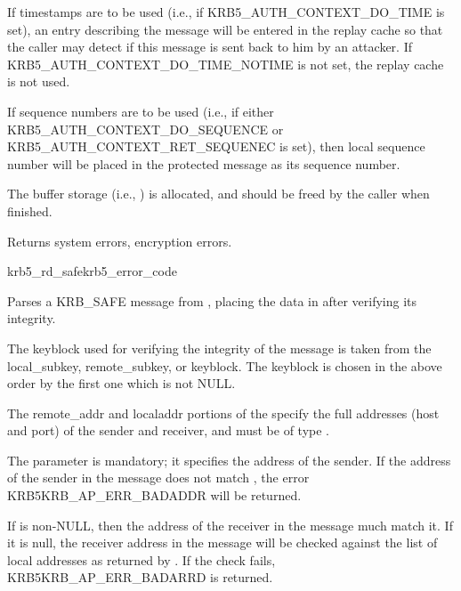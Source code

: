 If timestamps are to be used (i.e., if KRB5_AUTH_CONTEXT_DO_TIME is
set), an entry describing the message will be entered in the replay
cache so that the caller may detect if this message is sent
back to him by an attacker.  If KRB5_AUTH_CONTEXT_DO_TIME_NOTIME is not set,
the  replay cache is not used.

If sequence numbers are to be used (i.e., if either
KRB5_AUTH_CONTEXT_DO_SEQUENCE or KRB5_AUTH_CONTEXT_RET_SEQUENEC is
set), then  local sequence number will be
placed in the protected message as its sequence number.  

The  buffer storage (i.e.,
) is allocated, and should be freed by
the caller when finished.

Returns system errors, encryption errors.

\begin{funcdecl}{krb5_rd_safe}{krb5_error_code}{\funcinout}
\funcin
{}
\funcout
{}
\funcinout
{}
\end{funcdecl}

Parses a KRB_SAFE message from , placing the
data in  after verifying its integrity.

The keyblock used for verifying the integrity of the message is taken
from the  local_subkey, remote_subkey, or
keyblock. The keyblock is chosen in the above order by the first one
which is not NULL.
 
The remote_addr and localaddr portions of the 
specify the full addresses (host and port) of the sender and receiver,
and must be of type .


The  parameter is mandatory; it
specifies the address of the sender.  If the address of the sender in
the message does not match , the error
KRB5KRB_AP_ERR_BADADDR will be returned.

If  is non-NULL, then the address of the receiver
in the message much match it.  If it is null, the receiver address in
the message will be checked against the list of local addresses as
returned by . If the check fails,
KRB5KRB_AP_ERR_BADARRD is returned.

